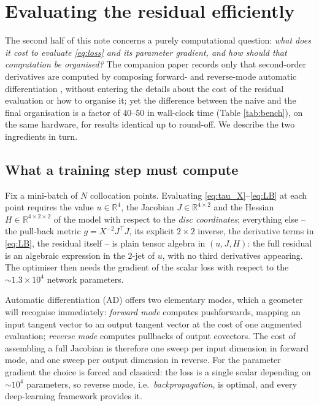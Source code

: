 \documentclass[oneside,british]{amsart}
\numberwithin{equation}{section}
\numberwithin{figure}{section}
\theoremstyle{plain}
\numberwithin{thm}{section}
\theoremstyle{plain}
\theoremstyle{plain}
\theoremstyle{definition}
\theoremstyle{remark}
\begin{document}
\section{Evaluating the residual efficiently}\label{sec:efficiency}

The second half of this note concerns a purely computational question:
\emph{what does it cost to evaluate \eqref{eq:loss} and its parameter
gradient, and how should that computation be organised?} The companion
paper records only that second-order derivatives are computed by
composing forward- and reverse-mode automatic differentiation
\cite[\S3.3]{SchettiniUsula2026}, without entering the details about the cost of the
residual evaluation or how to organise it; yet the difference between
the naive and the final organisation is a factor of $40$--$50$ in
wall-clock time (Table \ref{tab:bench}), on the same hardware, for
results identical up to round-off. We describe the two ingredients in
turn.

\subsection{What a training step must compute}\label{subsec:anatomy}

Fix a mini-batch of $N$ collocation points. Evaluating
\eqref{eq:tau_X}--\eqref{eq:LB} at each point requires the value
$u\in\mathbb{R}^{4}$, the Jacobian $J\in\mathbb{R}^{4\times2}$ and the
Hessian $H\in\mathbb{R}^{4\times2\times2}$ of the model with respect to
the \emph{disc coordinates}; everything else -- the pull-back metric
$g=X^{-2}J^{\top}J$, its explicit $2\times2$ inverse, the derivative
terms in \eqref{eq:LB}, the residual itself -- is plain tensor algebra
in $(u,J,H)$: the full residual is an algebraic expression in the
$2$-jet of $u$, with no third derivatives appearing. The optimiser then
needs the gradient of the scalar loss with respect to the
$\sim1.3\times10^{4}$ network parameters.

Automatic differentiation (AD) \cite{baydin2018automatic,griewank2008evaluating}
offers two elementary modes, which a geometer will recognise
immediately: \emph{forward mode} computes pushforwards, mapping an
input tangent vector to an output tangent vector at the cost of one
augmented evaluation; \emph{reverse mode} computes pullbacks of output
covectors. The cost of assembling a full Jacobian is therefore one
sweep per input dimension in forward mode, and one sweep per output
dimension in reverse. For the parameter gradient the choice is forced
and classical: the loss is a single scalar depending on
$\sim10^{4}$ parameters, so reverse mode, i.e.~\textit{backpropagation},
is optimal, and every deep-learning framework provides it.
\end{document}
